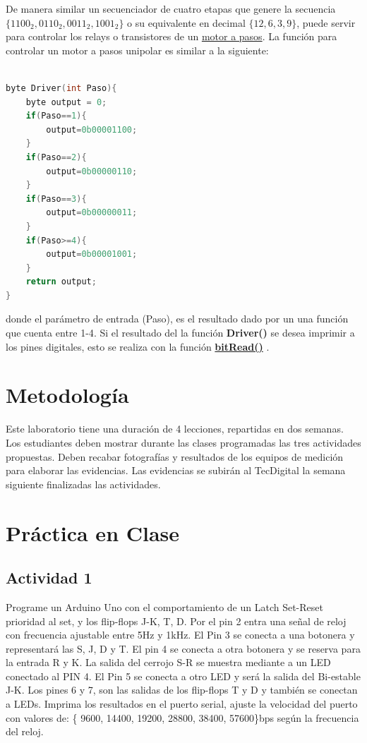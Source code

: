 De manera similar un secuenciador de cuatro etapas que genere la secuencia $\{1100_{2}, 0110_{2}, 0011_{2}, 1001_{2}\}$ o su equivalente en decimal    $\{12,6,3,9\}$, puede servir para controlar los relays o transistores de un \href{https://es.wikipedia.org/wiki/Motor_paso_a_paso}{motor a pasos}. La función para controlar un motor a pasos unipolar es similar a la siguiente:


\begin{lstlisting}[language=C++]

byte Driver(int Paso){
	byte output = 0;
	if(Paso==1){
		output=0b00001100; 
	}
	if(Paso==2){
		output=0b00000110;
	}
	if(Paso==3){
		output=0b00000011;
	}
	if(Paso>=4){
		output=0b00001001;
	}
	return output;
}
\end{lstlisting} donde el parámetro de entrada (Paso), es el resultado dado por un una función que cuenta entre {1-4}. Si el resultado del la función \textbf{Driver()} se desea imprimir a los pines digitales, esto se realiza con la función \href{https://www.arduino.cc/reference/en/language/functions/bits-and-bytes/bitread/}{\textbf{bitRead()}} .
  
\section{Metodología}

Este laboratorio tiene una duración de 4 lecciones, repartidas en dos semanas. Los estudiantes deben mostrar durante las clases programadas las tres actividades propuestas. Deben recabar fotografías y resultados de los equipos de medición para elaborar las evidencias. Las evidencias se subirán al TecDigital la semana siguiente finalizadas las actividades.

\section{Práctica en Clase}

\subsection{Actividad 1}

Programe un Arduino Uno con el comportamiento de un Latch Set-Reset prioridad al set, y los flip-flops J-K, T, D.  Por el pin 2 entra una señal de reloj con frecuencia ajustable entre 5Hz y 1kHz. El Pin 3  se conecta a una botonera y representar\'a las  S, J, D y T.  El pin 4 se conecta a otra botonera y se  reserva para la entrada R y K. La salida del cerrojo S-R se muestra mediante a un LED conectado al PIN 4. El Pin 5 se conecta a otro LED y será la salida del Bi-estable J-K. Los pines 6 y 7, son las salidas de los flip-flops T y D y también se conectan a LEDs. Imprima los resultados en el puerto serial, ajuste la velocidad del puerto con valores de: \{ 9600, 14400, 19200, 28800, 38400, 57600\}bps según la frecuencia del reloj.
 

